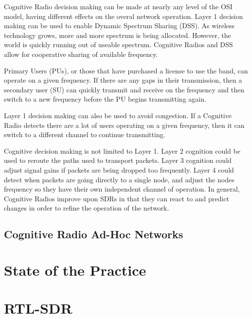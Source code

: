 Cognitive Radio decision making can be made at nearly any level of the OSI model, having different effects on the overal network operation. Layer 1 decision making can be used to enable Dynamic Spectrum Sharing (DSS). As wireless technology grows, more and more spectrum is being allocated. However, the world is quickly running out of useable spectrum. Cognitive Radios and DSS allow for cooperative sharing of available frequency. 

Primary Users (PUs), or those that have purchased a license to use the band, can operate on a given frequency. If there are any gaps in their transmission, then a secondary user (SU) can quickly transmit and receive on the frequency and then switch to a new frequency before the PU begins transmitting again. 

Layer 1 decision making can also be used to avoid congestion. If a Cognitive Radio detects there are a lot of users operating on a given frequency, then it can switch to a different channel to continue transmitting. 

Cognitive decision making is not limited to Layer 1. Layer 2 cognition could be used to reroute the paths used to transport packets. Layer 3 cognition could adjust signal gains if packets are being dropped too frequently. Layer 4 could detect when packets are going directly to a single node, and adjust the nodes frequency so they have their own independent channel of operation. In general, Cognitive Radios improve upon SDRs in that they can react to and predict changes in order to refine the operation of the network. 

\subsection{Cognitive Radio Ad-Hoc Networks}

  

\section{State of the Practice}

\section{RTL-SDR}

